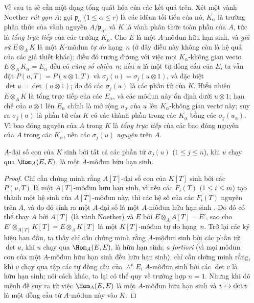 \documentclass[oneside,10pt]{amsart}
\makeatletter
\renewcommand{\leq}{\leqslant}
\newcommand{\ega@arrow}[2]{\mathchoice{#1}{#2}{#2}{#2}}
\let\ega@shortmapsto\mapsto
\renewcommand{\mapsto}{\ega@arrow{\longmapsto}{\ega@shortmapsto}}
\newcommand{\oldpage}[2][]{\marginnote{\normalfont\footnotesize\textbf{#1}~|~#2}\ignorespaces}
\let\EGAOriginalLabel\label
\renewcommand{\label}[1]{\phantomsection\EGAOriginalLabel{#1}}
\makeatother
\begin{document}
\begin{remark}[6.4.7]
\label{II.6.4.7}
Về sau ta sẽ cần một dạng tổng quát hóa của các kết quả trên.
Xét một vành Noether \emph{rút gọn} $A$;
gọi $\mathfrak{p}_\alpha$ ($1\leq\alpha\leq r$) là các iđêan tối tiểu của nó, $K_\alpha$ là trường phân thức của vành nguyên $A/\mathfrak{p}_\alpha$, và $K$ là vành phân thức toàn phần của $A$, tức là \emph{tổng trực tiếp} của các trường $K_\alpha$.
Cho $E$ là một $A$-môđun hữu hạn sinh, và \emph{giả sử} $E\otimes_A K$ là một $K$-môđun \emph{tự do} hạng~$n$ (ở đây điều này không còn là hệ quả của các giả thiết khác);
điều đó tương đương với việc mọi $K_\alpha$-không gian vectơ $E\otimes_A K_\alpha=E_\alpha$ đều có \emph{cùng số chiều~$n$};
nếu $u$ là một tự đồng cấu của $E$, ta vẫn đặt $P(u,T)=P(u\otimes1,T)$ và $\sigma_j(u)=\sigma_j(u\otimes1)$, và đặc biệt $\det u=\det(u\otimes1)$;
do đó các $\sigma_j(u)$ là các phần tử của $K$.
Hiển nhiên $E\otimes_A K$ là tổng trực tiếp của các $E_\alpha$, và các môđun này ổn định dưới $u\otimes1$;
hạn chế của $u\otimes1$ lên $E_\alpha$ chính là mở rộng $u_\alpha$ của $u$ lên $K_\alpha$-không gian vectơ này;
suy ra $\sigma_j(u)$ là phần tử của $K$ có các thành phần trong các $K_\alpha$ bằng các $\sigma_j(u_\alpha)$.
Vì bao đóng nguyên của $A$ trong $K$ là \emph{tổng trực tiếp} của các bao đóng nguyên của $A$ trong các $K_\alpha$, nên các $\sigma_j(u)$ \emph{nguyên} trên $A$.

\begin{lemma}[6.4.7.1]
\label{II.6.4.7.1}
$A$-đại số con của $K$ sinh bởi tất cả các phần tử $\sigma_j(u)$ ($1\leq j\leq n$), khi $u$ chạy qua $\Hom_A(E,E)$, là một $A$-môđun hữu hạn sinh.
\end{lemma}

\begin{proof}
Chỉ cần chứng minh rằng $A[T]$-đại số con của $K[T]$ sinh bởi các $P(u,T)$ là một $A[T]$-môđun hữu hạn sinh, vì nếu các $F_i(T)$ ($1\leq i\leq m$) tạo thành một hệ sinh của $A[T]$-môđun này, thì các hệ số của các $F_i(T)$ nguyên trên $A$, và do đó sinh ra một $A$-đại số là một $A$-môđun hữu hạn sinh \cite[t.~I, p.~255, th.~1]{I-13}.
Do đó có thể
\oldpage[II]{123}
thay $A$ bởi $A[T]$ (là vành Noether) và $E$ bởi $E\otimes_A A[T]=E'$, sao cho $E'\otimes_{A[T]}K[T]=E\otimes_A K[T]$ là một $K[T]$-môđun tự do hạng~$n$.
Trở lại các ký hiệu ban đầu, ta thấy chỉ cần chứng minh rằng $A$-môđun sinh bởi các phần tử $\det u$, khi $u$ chạy qua $\Hom_A(E,E)$, là hữu hạn sinh;
\emph{a fortiori} (vì mọi môđun con của một $A$-môđun hữu hạn sinh đều hữu hạn sinh), chỉ cần chứng minh rằng, khi $v$ chạy qua tập các tự đồng cấu của $\wedge^n E$, $A$-môđun sinh bởi các $\det v$ là hữu hạn sinh;
nói cách khác, ta lại có thể quy về trường hợp $n=1$.
Nhưng khi đó mệnh đề suy ra từ việc $\Hom_A(E,E)$ là một $A$-môđun hữu hạn sinh và $v\mapsto\det v$ là một đồng cấu từ $A$-môđun này vào $K$.
\end{proof}


\end{remark}
\end{document}
